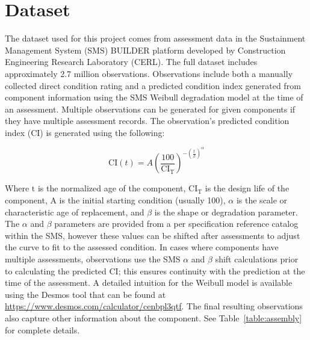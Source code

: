\documentclass[Journal,letterpaper,NoPageNumbers,NoLineNumbers]{ascelike-new}
\begin{document}
\section{Dataset}

The dataset used for this project comes from assessment data in the Sustainment Management System (SMS) BUILDER platform developed by Construction Engineering Research Laboratory (CERL). The full dataset includes approximately 2.7 million observations. Observations include both a manually collected direct condition rating and a predicted condition index generated from component information using the SMS Weibull degradation model at the time of an assessment. Multiple observations can be generated for given components if they have multiple assessment records. The observation's predicted condition index (CI) is generated using the following:

\begin{equation}
\label{eq:sms-weibull-ci}
\mathrm{CI}(t) = A \left( \frac{100}{\mathrm{CI}_{\mathrm{T}}} \right)^{ -\left(\frac{t}{\beta}\right)^{\alpha} }
\end{equation}

Where $\mathrm{t}$ is the normalized age of the component, $\mathrm{CI_T}$ is the design life of the component, A is the initial starting condition (usually 100), $\alpha$ is the scale or characteristic age of replacement, and $\beta$ is the shape or degradation parameter. The $\alpha$ and $\beta$ parameters are provided from a per specification reference catalog within the SMS, however these values can be shifted after assessments to adjust the curve to fit to the assessed condition. In cases where components have multiple assessments, observations use the SMS $\alpha$ and $\beta$ shift calculations prior to calculating the predicted CI; this ensures continuity with the prediction at the time of the assessment. A detailed intuition for the Weibull model is available using the Desmos tool that can be found at \url{https://www.desmos.com/calculator/cenbpl3qtf}. The final resulting observations also capture other information about the component. See Table~\ref{table:assembly} for complete details.
\end{document}
